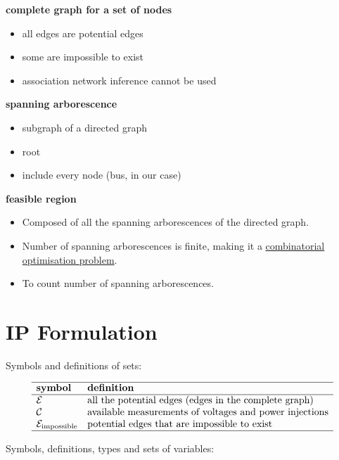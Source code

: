 \documentclass[
]{book}
\providecommand{\tightlist}{%
  \setlength{\itemsep}{0pt}\setlength{\parskip}{0pt}}
\begin{document}
\textbf{complete graph for a set of nodes}

\begin{itemize}
\tightlist
\item
  all edges are potential edges
\item
  some are impossible to exist
\item
  association network inference cannot be used
\end{itemize}

\textbf{spanning arborescence}

\begin{itemize}
\tightlist
\item
  subgraph of a directed graph
\item
  root
\item
  include every node (bus, in our case)
\end{itemize}

\textbf{feasible region}

\begin{itemize}
\tightlist
\item
  Composed of all the spanning arborescences of the directed graph.
\item
  Number of spanning arborescences is finite, making it a \protect\hyperlink{combinatorial}{combinatorial
  optimisation problem}.
\item
  To count number of spanning arborescences.
\end{itemize}

\hypertarget{ip-formulation}{%
\section{IP Formulation}\label{ip-formulation}}

Symbols and definitions of sets:

\[
\begin{array}{ll}
    \hline
    \textbf{symbol} & \textbf{definition} \\
    \hline
    \mathcal{E}
    & \text{all the potential edges (edges in the complete graph)} \\
    \mathcal{C}
    & \text{available measurements of voltages and power injections} \\
    \mathcal{E}_\text{impossible}
    & \text{potential edges that are impossible to exist} \\
    \hline
\end{array}
\]

Symbols, definitions, types and sets of variables:
\end{document}
